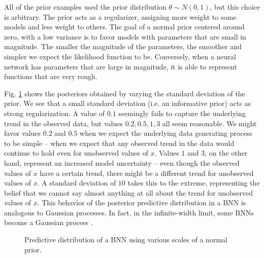 \documentclass[12pt]{article}
\begin{document}
All of the prior examples used the prior distribution $\theta \sim N(0, 1)$, but this choice is arbitrary. The prior acts as a regularizer, assigning more weight to some models and less weight to others. The goal of a normal prior centered around zero, with a low variance is to favor models with parameters that are small in magnitude. The smaller the magnitude of the parameters, the smoother and simpler we expect the likelihood function to be. Conversely, when a neural network has parameters that are large in magnitude, it is able to represent functions that are very rough.

Fig. \ref{fig_1d_predictions_by_stdev} shows the posteriors obtained by varying the standard deviation of the prior. We see that a small standard deviation (i.e. an informative prior) acts as strong regularization. A value of $0.1$ seemingly fails to capture the underlying trend in the observed data, but values $0.2, 0.5, 1, 3$ all seem reasonable. We might favor values $0.2$ and $0.5$ when we expect the underlying data generating process to be simple -- when we expect that any observed trend in the data would continue to hold even for unobserved values of $x$. Values $1$ and $3$, on the other hand, represent an increased model uncertainty -- even though the observed values of $x$ have a certain trend, there might be a different trend for unobserved values of $x$. A standard deviation of $10$ takes this to the extreme, representing the belief that we cannot say almost anything at all about the trend for unobserved values of $x$. This behavior of the posterior predictive distribution in a BNN is analogous to Gaussian processes. In fact, in the infinite-width limit, some BNNs become a Gaussian process \cite{neural_tangents}.

\begin{figure}[H]
\centering
{}
\caption{Predictive distribution of a BNN using various scales of a normal prior.}
\label{fig_1d_predictions_by_stdev}
\end{figure}
\end{document}
